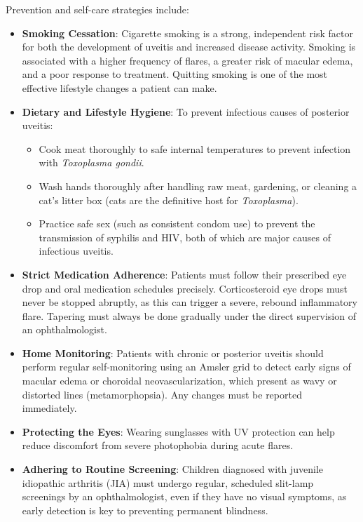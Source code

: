 Prevention and self-care strategies include:
\begin{itemize}
    \item \textbf{Smoking Cessation}: Cigarette smoking is a strong, independent risk factor for both the development of uveitis and increased disease activity. Smoking is associated with a higher frequency of flares, a greater risk of macular edema, and a poor response to treatment. Quitting smoking is one of the most effective lifestyle changes a patient can make.
    \item \textbf{Dietary and Lifestyle Hygiene}: To prevent infectious causes of posterior uveitis:
    \begin{itemize}
        \item Cook meat thoroughly to safe internal temperatures to prevent infection with \textit{Toxoplasma gondii}.
        \item Wash hands thoroughly after handling raw meat, gardening, or cleaning a cat's litter box (cats are the definitive host for \textit{Toxoplasma}).
        \item Practice safe sex (such as consistent condom use) to prevent the transmission of syphilis and HIV, both of which are major causes of infectious uveitis.
    \end{itemize}
    \item \textbf{Strict Medication Adherence}: Patients must follow their prescribed eye drop and oral medication schedules precisely. Corticosteroid eye drops must never be stopped abruptly, as this can trigger a severe, rebound inflammatory flare. Tapering must always be done gradually under the direct supervision of an ophthalmologist.
    \item \textbf{Home Monitoring}: Patients with chronic or posterior uveitis should perform regular self-monitoring using an Amsler grid to detect early signs of macular edema or choroidal neovascularization, which present as wavy or distorted lines (metamorphopsia). Any changes must be reported immediately.
    \item \textbf{Protecting the Eyes}: Wearing sunglasses with UV protection can help reduce discomfort from severe photophobia during acute flares.
    \item \textbf{Adhering to Routine Screening}: Children diagnosed with juvenile idiopathic arthritis (JIA) must undergo regular, scheduled slit-lamp screenings by an ophthalmologist, even if they have no visual symptoms, as early detection is key to preventing permanent blindness.
\end{itemize}

